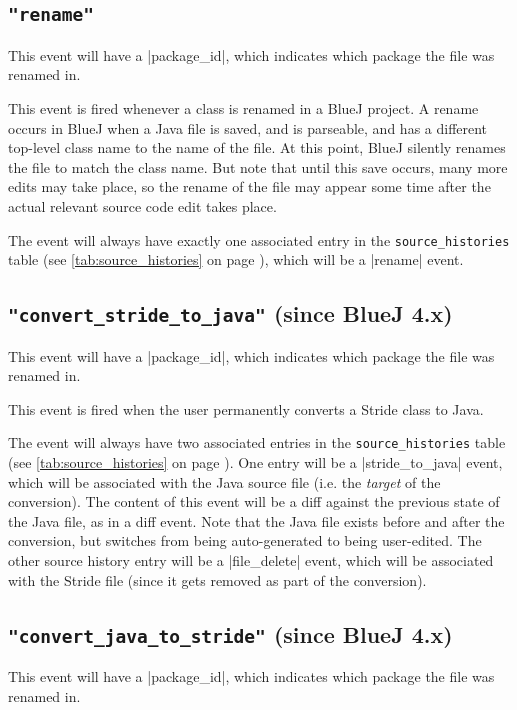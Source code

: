 \documentclass{report}
\newcommand{\myref}[1]{\autoref{#1} on page \pageref*{#1}}
\newcommand{\tabref}[1]{\lstinline|#1| table (see \myref{tab:#1})}
\begin{document}
\subsection{\lstinline!"rename"!}

This event will have a |package_id|, which indicates which package the file
was renamed in.

This event is fired whenever a class is renamed in a BlueJ project.  A rename
occurs in BlueJ when a Java file is saved, and is parseable, and has a
different top-level class name to the name of the file.  At this point, BlueJ
silently renames the file to match the class name.  But note that until this
save occurs, many more edits may take place, so the rename of the file may
appear some time after the actual relevant source code edit takes place.

The event will always have exactly one associated entry in the
\tabref{source_histories}, which will be a |rename| event.

\subsection{\lstinline!"convert_stride_to_java"! (since BlueJ 4.x)}

This event will have a |package_id|, which indicates which package the file
was renamed in.

This event is fired when the user permanently converts a Stride class to Java.

The event will always have two associated entries in the
\tabref{source_histories}.  One entry will be a |stride_to_java| event, which will
be associated with the Java source file (i.e. the \textit{target} of the conversion).  The content
  of this event will be a diff against the previous state of the Java file, as in a diff event.  Note that the Java file exists before and after the conversion, but switches from being auto-generated to being user-edited.
The other source history entry will be a |file_delete| event, which will be associated with the Stride file (since it gets
removed as part of the conversion).

\subsection{\lstinline!"convert_java_to_stride"! (since BlueJ 4.x)}

This event will have a |package_id|, which indicates which package the file
was renamed in.
\end{document}
